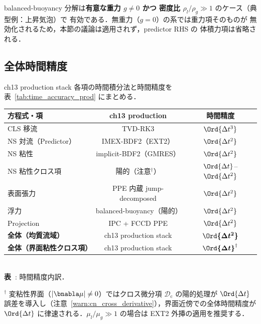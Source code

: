 \begin{tcolorbox}[colback=yellow!5,colframe=orange!60!black,title={\textbf{適用範囲：浮力分解の有効ケース}}]
\label{warn:balanced_buoy_scope}
balanced-buoyancy 分解は\textbf{有意な重力 $g \neq 0$ かつ
密度比 $\rho_l/\rho_g \gg 1$} のケース（典型例：上昇気泡）で
有効である．無重力（$g=0$）の系では重力項そのものが
無効化されるため，本節の議論は適用されず，predictor RHS の
体積力項は省略される．
\end{tcolorbox}

\subsection{全体時間精度}
\label{sec:time_accuracy_table}

ch13 production stack 各項の時間積分法と時間精度を表~\ref{tab:time_accuracy_prod}
にまとめる．

\begin{center}
\renewcommand{\arraystretch}{1.3}
\begin{tabular}{lcc}
\hline
方程式・項 & ch13 production & 時間精度 \\
\hline
CLS 移流 & TVD-RK3 & $\Ord{\Delta t^3}$ \\
NS 対流（Predictor）& IMEX-BDF2（EXT2）& $\Ord{\Delta t^2}$ \\
NS 粘性 & implicit-BDF2（GMRES）& $\Ord{\Delta t^2}$ \\
NS 粘性クロス項 & 陽的（注意$^\dagger$）& $\Ord{\Delta t}$--$\Ord{\Delta t^2}$ \\
表面張力 & PPE 内蔵 jump-decomposed & $\Ord{\Delta t^2}$ \\
浮力 & balanced-buoyancy（陽的）& $\Ord{\Delta t^2}$ \\
Projection & IPC + FCCD PPE & $\Ord{\Delta t^2}$ \\
\hline
\textbf{全体（均質流域）}& ch13 production stack & $\boldsymbol{\Ord{\Delta t^2}}$ \\
\textbf{全体（界面粘性クロス項）}& ch13 production stack & $\boldsymbol{\Ord{\Delta t}}^\dagger$ \\
\hline
\end{tabular}\\
\label{tab:time_accuracy_prod}\textbf{表~\thetable}: 時間精度内訳．
\end{center}

{\small $^\dagger$ 変粘性界面（$|\bnabla\mu| \neq 0$）ではクロス微分項 $\mathcal{D}_{\mathrm{c}}$ の陽的処理が $\Ord{\Delta t}$ 誤差を導入し（注意~\ref{warn:cn_cross_derivative}），界面近傍での全体時間精度が $\Ord{\Delta t}$ に律速される．$\mu_l/\mu_g \gg 1$ の場合は EXT2 外挿の適用を推奨する．}

